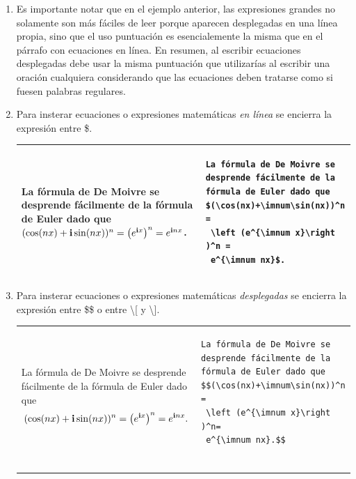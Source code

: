 \documentclass[11pt,letterpaper,twoside]{report}%
\begin{document}
\begin{tipbox}{}
\begin{enumerate}
\item Es importante notar que en el ejemplo anterior, las expresiones grandes no solamente son más fáciles de leer porque aparecen desplegadas en una línea propia, sino que el uso puntuación es esencialemente la  misma que en el párrafo con ecuaciones en línea.  En resumen, al escribir ecuaciones desplegadas debe usar la misma puntuación que utilizarías al escribir una oración cualquiera considerando que las ecuaciones deben tratarse como si fuesen palabras regulares.

\item Para insterar ecuaciones o expresiones matemáticas {\em en línea} se encierra la expresión entre \$.
\vspace*{-\baselineskip}
\begin{center}
\begin{tabular}{|p{65mm}|p{65mm}|}
\hline
\parbox[t]{6cm}{
La fórmula de De Moivre se desprende fácilmente de la fórmula de Euler dado que
$(\cos(nx)+\mathbf{i}\sin(nx))^n=\left (e^{\mathbf{i} x}\right )^n=e^{\mathbf{i} nx}$.}
& \vspace*{-.5\baselineskip}
\begin{minipage}{7cm}
\begin{Verbatim}
La fórmula de De Moivre se 
desprende fácilmente de la 
fórmula de Euler dado que
$(\cos(nx)+\imnum\sin(nx))^n =
 \left (e^{\imnum x}\right )^n =
 e^{\imnum nx}$.

\end{Verbatim}
\end{minipage}
\\
\hline
\end{tabular}
\end{center}

\item Para insterar ecuaciones o expresiones matemáticas {\em desplegadas} se encierra la expresión entre \$\$ o entre \textbackslash [ y \textbackslash ].
\vspace*{-\baselineskip}
\begin{center}
\begin{tabular}{|p{65mm}|p{65mm}|}
\hline
\parbox[t]{6cm}{
La fórmula de De Moivre se desprende fácilmente de la fórmula de Euler dado que
$$(\cos(nx)+\mathbf{i}\sin(nx))^n=\left (e^{\mathbf{i} x}\right )^n=e^{\mathbf{i} nx}.$$}
& \vspace*{-.5\baselineskip}
\begin{minipage}{7cm}
\begin{Verbatim}
La fórmula de De Moivre se 
desprende fácilmente de la 
fórmula de Euler dado que
$$(\cos(nx)+\imnum\sin(nx))^n =
 \left (e^{\imnum x}\right )^n=
 e^{\imnum nx}.$$


\end{Verbatim}
\end{minipage}
\end{tabular}
\end{center}
\end{enumerate}
\end{tipbox}
\end{document}
